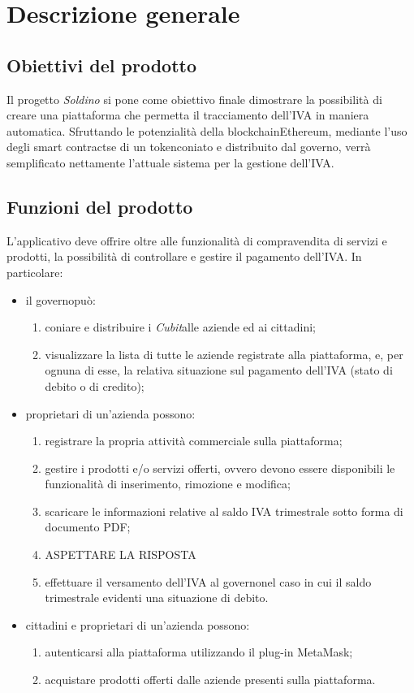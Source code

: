 \section{Descrizione generale} 
\subsection{Obiettivi del prodotto}

Il progetto \textit{Soldino} si pone come obiettivo finale dimostrare la possibilità di creare una piattaforma che permetta il tracciamento dell'IVA in maniera automatica. Sfruttando le potenzialità della blockchain\glosp Ethereum\glo, mediante l'uso degli smart contracts\glosp e di un token\glosp coniato e distribuito dal governo\glo, verrà semplificato nettamente l'attuale sistema per la gestione dell'IVA.

\subsection{Funzioni del prodotto}
L'applicativo deve offrire oltre alle funzionalità di compravendita di servizi e prodotti, la possibilità di controllare e gestire il pagamento dell'IVA. In particolare: 
\begin{itemize}
	\item il governo\glosp può:
	\begin{enumerate}[label=\alph*.]
		\item coniare e distribuire i \textit{Cubit}\glosp alle aziende ed ai cittadini;
		\item visualizzare la lista di tutte le aziende registrate alla piattaforma, e, per ognuna di esse, la relativa situazione sul pagamento dell'IVA (stato di debito o di credito); 
	\end{enumerate}
	
	\item proprietari di un'azienda possono:
	\begin{enumerate}[label=\alph*.]
		\item registrare la propria attività commerciale sulla piattaforma;
		\item gestire i prodotti e/o servizi offerti, ovvero devono essere disponibili le funzionalità di inserimento, rimozione e modifica;
		\item scaricare le informazioni relative al saldo IVA trimestrale sotto forma di documento PDF;
		\item ASPETTARE LA RISPOSTA
		\item effettuare il versamento dell'IVA al governo\glosp nel caso in cui il saldo trimestrale evidenti una situazione di debito.
	\end{enumerate}
	\item cittadini e proprietari di un'azienda possono:
		\begin{enumerate}[label=\alph*.]
			\item autenticarsi alla piattaforma utilizzando il plug-in MetaMask\glo;
			\item acquistare prodotti offerti dalle aziende presenti sulla piattaforma.
	\end{enumerate}
\end{itemize}
